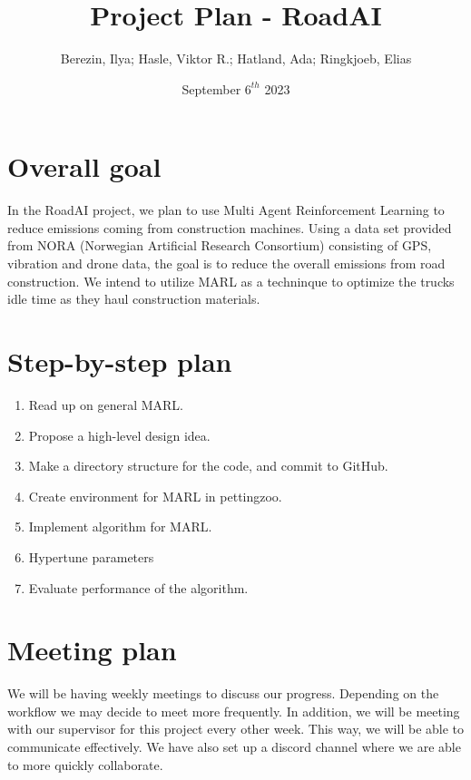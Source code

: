 \documentclass{article}
\title{Project Plan - RoadAI}
\author{Berezin, Ilya; Hasle, Viktor R.; Hatland, Ada; Ringkjoeb, Elias}
\date{September $6^{th}$ 2023}
\begin{document}
\maketitle

\section{Overall goal}
In the RoadAI project, we plan to use Multi Agent Reinforcement Learning to reduce emissions coming from
construction machines. Using a data set provided from NORA (Norwegian Artificial Research Consortium) consisting of GPS, vibration and drone data, the goal is to reduce the overall emissions from road construction. We intend to utilize MARL as a techninque to optimize
the trucks idle time as they haul construction materials.

\section{Step-by-step plan}
\begin{enumerate}
  \item Read up on general MARL.
  \item Propose a high-level design idea.
  \item Make a directory structure for the code, and commit to GitHub.
  \item Create environment for MARL in pettingzoo.
  \item Implement algorithm for MARL. 
  \item Hypertune parameters
  \item Evaluate performance of the algorithm.
\end{enumerate}

\section{Meeting plan}
We will be having weekly meetings to discuss our progress. Depending on the workflow we may decide to 
meet more frequently. In addition, we will be meeting with our supervisor for this project every other week. This way,
we will be able to communicate effectively. We have also set up a discord channel where we are able to more quickly collaborate.
\end{document}
